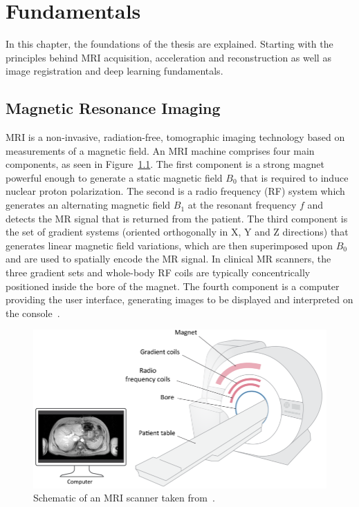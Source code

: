 
\chapter{Fundamentals} \label{Ch:Fundamentals}
In this chapter, the foundations of the thesis are explained. Starting with the principles behind MRI acquisition, acceleration and reconstruction as well as image registration and deep learning fundamentals.

\section{Magnetic Resonance Imaging} \label{Sec:MRI}
MRI is a non-invasive, radiation-free, tomographic imaging technology based on measurements of a magnetic field.  An MRI machine comprises four main components, as seen in Figure~\ref{fig:MRISchematic}. The first component is a strong magnet powerful enough to generate a static magnetic field $B_0$ that is required to induce nuclear proton polarization. The second is a radio frequency (RF) system which generates an alternating magnetic field $B_1$ at the resonant frequency $f$ and detects the MR signal that is returned from the patient. The third component is the set of gradient systems (oriented orthogonally in X, Y and Z directions) that generates linear magnetic field variations, which are then superimposed upon $B_0$ and are used to spatially encode the MR signal. In clinical MR scanners, the three gradient sets and whole-body RF coils are typically concentrically positioned inside the bore of the magnet. The fourth component is a computer providing the user interface, generating images to be displayed and interpreted on the console~\cite{Serai2021}.

\begin{figure}[h] %
 	\centering
 	\includegraphics[width=\linewidth]{./Images/MRI-Schematic.png} 
 	\caption{Schematic of an MRI scanner taken from~\cite{Serai2021}.}
 	\label{fig:MRISchematic}
 \end{figure} 

